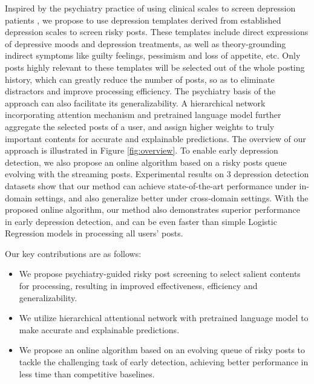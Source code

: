 Inspired by the psychiatry practice of using clinical scales to screen depression patients \citep{beck1996beck}, we propose to use depression templates derived from established depression scales to screen risky posts. These templates include direct expressions of depressive moods and depression treatments, as well as theory-grounding indirect symptoms like guilty feelings, pessimism and loss of appetite, etc. Only posts highly relevant to these templates will be selected out of the whole posting history, which can greatly reduce the number of posts, so as to eliminate distractors and improve processing efficiency. The psychiatry basis of the approach can also facilitate its generalizability. A hierarchical network incorporating attention mechanism \citep{yang2016hierarchical} and pretrained language model \citep{devlin2018bert} further aggregate the selected posts of a user, and assign higher weights to truly important contents for accurate and explainable predictions. The overview of our approach is illustrated in Figure \ref{fig:overview}. To enable early depression detection, we also propose an online algorithm based on a risky posts queue evolving with the streaming posts. Experimental results on 3 depression detection datasets show that our method can achieve state-of-the-art performance under in-domain settings, and also generalize better under cross-domain settings. With the proposed online algorithm, our method also demonstrates superior performance in early depression detection, and can be even faster than simple Logistic Regression models in processing all users' posts.

Our key contributions are as follows:
\begin{itemize}
    \item We propose psychiatry-guided risky post screening to select salient contents for processing, resulting in improved effectiveness, efficiency and generalizability.
    \item We utilize hierarchical attentional network with pretrained language model to make accurate and explainable predictions.
    \item We propose an online algorithm based on an evolving queue of risky posts to tackle the challenging task of early detection, achieving better performance in less time than competitive baselines. 
\end{itemize}
